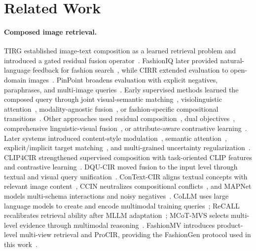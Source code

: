 \section{Related Work}
\label{sec:related}

\paragraph{Composed image retrieval.}
TIRG established image-text composition as a learned retrieval problem and introduced a gated residual fusion operator~\cite{vo2019tirg}. FashionIQ later provided natural-language feedback for fashion search~\cite{wufashioniq}, while CIRR extended evaluation to open-domain images~\cite{liucirr}. PinPoint broadens evaluation with explicit negatives, paraphrases, and multi-image queries~\cite{mahadev2026pinpoint}. Early supervised methods learned the composed query through joint visual-semantic matching~\cite{chen2020jvsm}, visiolinguistic attention~\cite{chen2020val}, modality-agnostic fusion~\cite{dodds2020maaf}, or fashion-specific compositional transitions~\cite{yu2020curlingnet}. Other approaches used residual composition~\cite{shin2021rtic}, dual objectives~\cite{kim2021dcnet}, comprehensive linguistic-visual fusion~\cite{wen2021clvc}, or attribute-aware contrastive learning~\cite{tian2022aacl}. Later systems introduced content-style modulation~\cite{lee2021cosmo}, semantic attention~\cite{jandial2022sac}, explicit/implicit target matching~\cite{delmas2022artemis}, and multi-grained uncertainty regularization~\cite{chen2022mur}. CLIP4CIR strengthened supervised composition with task-oriented CLIP features and contrastive learning~\cite{baldrati2022clip4cir}. DQU-CIR moved fusion to the input level through textual and visual query unification~\cite{wen2024dqu}. ConText-CIR aligns textual concepts with relevant image content~\cite{xing2025context}, CCIN neutralizes compositional conflicts~\cite{tian2025ccin}, and MAPNet models multi-schema interactions and noisy negatives~\cite{shi2025mapnet}. CoLLM uses large language models to create and encode multimodal training queries~\cite{huynh2025collm}; ReCALL recalibrates retrieval ability after MLLM adaptation~\cite{yang2026recall}; MCoT-MVS selects multi-level evidence through multimodal reasoning~\cite{ge2026mcot}. FashionMV introduces product-level multi-view retrieval and ProCIR, providing the FashionGen protocol used in this work~\cite{yuan2026fashionmv}.

